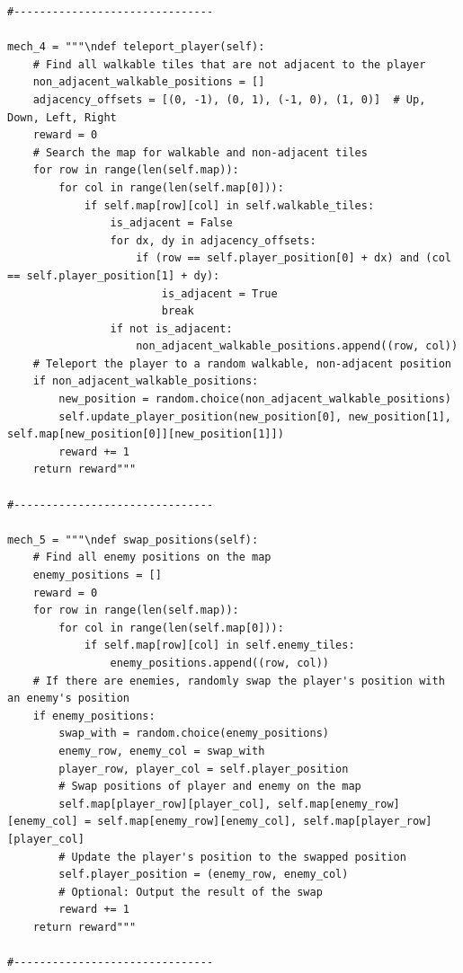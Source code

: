 \documentclass{article} %
\begin{document}
\begin{lstlisting}
#------------------------------- 

mech_4 = """\ndef teleport_player(self):
    # Find all walkable tiles that are not adjacent to the player
    non_adjacent_walkable_positions = []
    adjacency_offsets = [(0, -1), (0, 1), (-1, 0), (1, 0)]  # Up, Down, Left, Right
    reward = 0
    # Search the map for walkable and non-adjacent tiles
    for row in range(len(self.map)):
        for col in range(len(self.map[0])):
            if self.map[row][col] in self.walkable_tiles:
                is_adjacent = False
                for dx, dy in adjacency_offsets:
                    if (row == self.player_position[0] + dx) and (col == self.player_position[1] + dy):
                        is_adjacent = True
                        break
                if not is_adjacent:
                    non_adjacent_walkable_positions.append((row, col))
    # Teleport the player to a random walkable, non-adjacent position
    if non_adjacent_walkable_positions:
        new_position = random.choice(non_adjacent_walkable_positions)
        self.update_player_position(new_position[0], new_position[1], self.map[new_position[0]][new_position[1]])
        reward += 1
    return reward"""

#------------------------------- 

mech_5 = """\ndef swap_positions(self):
    # Find all enemy positions on the map
    enemy_positions = []
    reward = 0
    for row in range(len(self.map)):
        for col in range(len(self.map[0])):
            if self.map[row][col] in self.enemy_tiles:
                enemy_positions.append((row, col))
    # If there are enemies, randomly swap the player's position with an enemy's position
    if enemy_positions:
        swap_with = random.choice(enemy_positions)
        enemy_row, enemy_col = swap_with
        player_row, player_col = self.player_position
        # Swap positions of player and enemy on the map
        self.map[player_row][player_col], self.map[enemy_row][enemy_col] = self.map[enemy_row][enemy_col], self.map[player_row][player_col]
        # Update the player's position to the swapped position
        self.player_position = (enemy_row, enemy_col)
        # Optional: Output the result of the swap
        reward += 1
    return reward"""

#------------------------------- 


\end{lstlisting}
\end{document}
